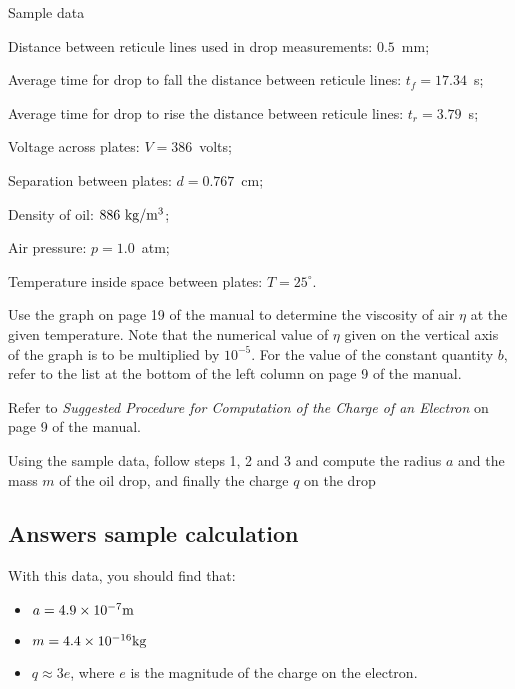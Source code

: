 Sample data
\begin{itemize*}
\item Distance between reticule lines used in drop measurements: $0.5$~mm;
\item Average time for drop to fall the distance between reticule lines: $t_f =
  17.34$~s; 
\item Average time for drop to rise the distance between reticule lines: $t_r =
  3.79$~s; 
\item Voltage across plates: $V = 386$~volts;
\item Separation between plates: $d = 0.767$~cm;
\item Density of oil: $886~{\rm kg}/{\rm m}^3$;
\item Air pressure: $p=1.0$~atm;
\item Temperature inside space between plates: $T= 25^\circ$.
\end{itemize*}

Use the graph on page 19 of the manual to determine the viscosity of air $\eta$ at
the given temperature.  Note that the numerical value of
$\eta$ given on the vertical axis of the graph is
to be multiplied by $10^{-5}$.  For
the value of the constant quantity $b$, refer to the list at the bottom
of the left column on page 9 of the manual.

Refer to {\em Suggested Procedure for Computation of
the Charge of an Electron} on page 9 of the manual.

Using the sample data, follow steps 1, 2 and 3 and compute the radius $a$
and the mass $m$ of the oil drop, and finally the charge $q$ on the drop


\subsection{Answers sample calculation}

With this data, you should find that:
\begin{itemize}
\item $a = 4.9 \times 10^{-7} {\rm m}$

\item $m = 4.4 \times 10^{-16} {\rm kg}$

\item $q \approx 3e$, where $e$ is the magnitude of
the charge on the electron.
\end{itemize}


